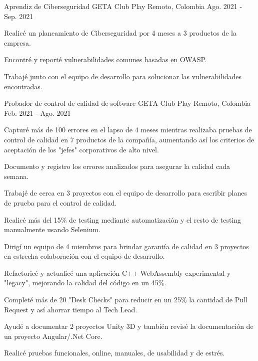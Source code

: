 \begin{cventries}
  \cventry
    {Aprendiz de Ciberseguridad} %
    {GETA Club Play} %
    {Remoto, Colombia} %
    {Ago. 2021 - Sep. 2021} %
    {
      \begin{cvitems} %
        \item {Realicé un planeamiento de Ciberseguridad por 4 meses a 3 productos de la empresa.}
        \item {Encontré y reporté vulnerabilidades comunes basadas en OWASP.}
        \item {Trabajé junto con el equipo de desarrollo para solucionar las vulnerabilidades encontradas.}
      \end{cvitems}
    }

  \cventry
    {Probador de control de calidad de software} %
    {GETA Club Play} %
    {Remoto, Colombia} %
    {Feb. 2021 - Ago. 2021} %
    {
      \begin{cvitems} %
        \item {Capturé más de 100 errores en el lapso de 4 meses mientras realizaba pruebas de control de calidad en 7 productos de la compañía, aumentando así los criterios de aceptación de los "jefes" corporativos de alto nivel.}
        \item {Documento y registro los errores analizados para asegurar la calidad cada semana.}
        \item {Trabajé de cerca en 3 proyectos con el equipo de desarrollo para escribir planes de prueba para el control de calidad.}
        \item {Realicé más del 15\% de testing mediante automatización y el resto de testing manualmente usando Selenium.}
        \item {Dirigí un equipo de 4 miembros para brindar garantía de calidad en 3 proyectos en estrecha colaboración con el equipo de desarrollo.}
        \item {Refactoricé y actualicé una aplicación C++ WebAssembly experimental y "legacy", mejorando la calidad del código en un 45\%.}
        \item {Completé más de 20 "Desk Checks" para reducir en un 25\% la cantidad de Pull Request y así ahorrar tiempo al Tech Lead.}
        \item {Ayudé a documentar 2 proyectos Unity 3D y también revisé la documentación de un proyecto Angular/.Net Core.}
        \item {Realicé pruebas funcionales, online, manuales, de usabilidad y de estrés.}
      \end{cvitems}
    }
\end{cventries}
